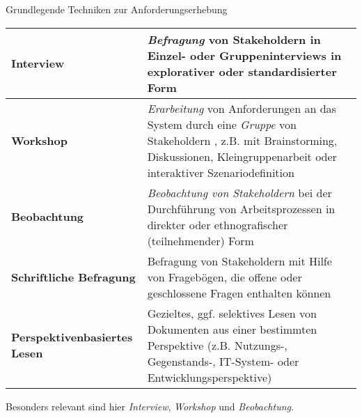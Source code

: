 \begin{defi}{Grundlegende Techniken zur Anforderungserhebung}
    \begin{tabularx}{\textwidth}{|>{\bfseries}l|X|}
        \hline
        Interview                   & \emph{Befragung} von Stakeholdern in Einzel- oder Gruppeninterviews in explorativer oder standardisierter Form                                                                               \\
        \hline
        Workshop                    & \emph{Erarbeitung} von Anforderungen an das System durch eine \emph{Gruppe} von Stakeholdern , z.B. mit Brainstorming, Diskussionen, Kleingruppenarbeit oder interaktiver Szenariodefinition \\
        \hline
        Beobachtung                 & \emph{Beobachtung von Stakeholdern} bei der Durchführung von Arbeitsprozessen in direkter oder ethnografischer (teilnehmender) Form                                                          \\
        \hline
        Schriftliche Befragung      & Befragung von Stakeholdern mit Hilfe von Fragebögen, die offene oder geschlossene Fragen enthalten können                                                                                    \\
        \hline
        Perspektivenbasiertes Lesen & Gezieltes, ggf. selektives Lesen von Dokumenten aus einer bestimmten Perspektive (z.B. Nutzungs-, Gegenstands-, IT-System- oder Entwicklungsperspektive)                                     \\
        \hline
    \end{tabularx}

    Besonders relevant sind hier \emph{Interview}, \emph{Workshop} und \emph{Beobachtung}.
\end{defi}


